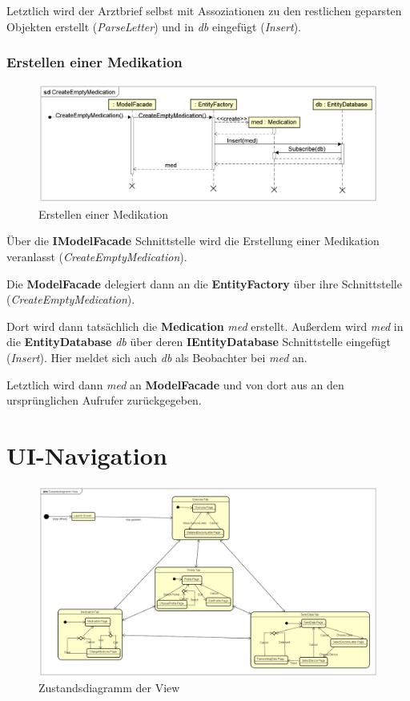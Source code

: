 \documentclass[a4paper]{scrreprt}
\begin{document}
Letztlich wird der Arztbrief selbst mit Assoziationen zu den restlichen geparsten Objekten erstellt (\textit{ParseLetter}) und in \textit{db} eingefügt (\textit{Insert}).


\subsubsection{Erstellen einer Medikation}
\begin{figure}[H]
\centering
\includegraphics[width=0.75\textheight]{graphics/Klassendiagramme/Model/CreateEmptyMedication.png}
\caption{Erstellen einer Medikation}
\end{figure}
Über die \textbf{IModelFacade} Schnittstelle wird die Erstellung einer Medikation veranlasst (\textit{CreateEmptyMedication}). 

Die \textbf{ModelFacade} delegiert dann an die \textbf{EntityFactory} über ihre Schnittstelle (\textit{CreateEmptyMedication}).

Dort wird dann tatsächlich die \textbf{Medication} \textit{med} erstellt. Außerdem wird 
\textit{med} in die \textbf{EntityDatabase} \textit{db} über deren \textbf{IEntityDatabase} Schnittstelle eingefügt (\textit{Insert}). Hier meldet sich auch \textit{db} als Beobachter bei \textit{med} an.

Letztlich wird dann \textit{med} an \textbf{ModelFacade} und von dort aus an den ursprünglichen Aufrufer zurückgegeben.

\section{UI-Navigation}
\begin{figure}[H]
\centering
\includegraphics[width=0.9\textheight, angle=90]{graphics/Zustandsdiagramm_View}
\caption{Zustandsdiagramm der View}
\end{figure}
\end{document}
